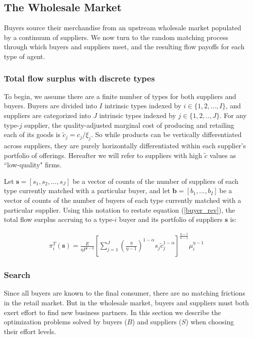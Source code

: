 \documentclass[12pt]{article} \usepackage{amsmath,amssymb,amsthm,geometry,graphicx,setspace,algorithm,algpseudocode,float}
\begin{document}
\subsection{The Wholesale Market}

Buyers source their merchandise from an upstream wholesale market populated by a continuum of  suppliers. We now turn to the random matching process through which buyers and suppliers meet, and the resulting flow payoffs for each type of agent. 

\label{sec:payoff_functions}

\subsubsection{Total flow surplus with discrete types}  
\label{sec:discrete_types}
To begin, we assume there are a finite number of types for both suppliers and buyers. Buyers are divided into $I$ intrinsic types indexed by $i\in \{1,2,...,I\}$, and  suppliers are categorized into $J$ intrinsic types indexed by $j\in \{1,2,..,J\}$. For any type-$j$ supplier, the quality-adjusted marginal cost of producing and retailing each of its goods is $\tilde{c}_{j}=c_j/\xi_j$. So while products can be vertically differentiated across suppliers, they are purely horizontally differentiated within each supplier's portfolio of offerings. Hereafter we will refer to suppliers with high $\tilde{c}$ values as ``low-quality" firms.
\par
Let $\mathbf{s}=\left[ s_{1},s_{2},...,s_{J}\right] $ be a vector of counts of
the number of suppliers of each type currently matched with a particular buyer, and let $\mathbf{b=}\left[ b_{1},...,b_{I}\right] \ $be a vector of counts of the number of buyers of each type currently matched with a particular supplier.
Using this notation to restate equation (\ref{buyer_rev}), the total flow surplus accruing to a type-$i$ buyer and its portfolio of suppliers $\mathbf{s}$ is:

\begin{align}
\pi _{i}^{T}(\mathbf{s})=\frac{E}{\eta P^{1-\eta }}\left[ \sum_{j=1}^{J}\left( 
\frac{\eta }{\eta -1}\right) ^{1-\alpha }s_{j}\tilde{c}_{j}^{1-\alpha }\right] ^{\frac{\eta -1}{\alpha -1}}\mu _{i}^{\eta -1}  \label{total_surplus}
\end{align}

\subsubsection{Search}
\label{sec:search}
Since all buyers are known to the final consumer, there are no matching frictions in the retail market. But in the wholesale market, buyers and suppliers must both exert effort to find new business partners. In this section we describe the optimization problems solved by buyers ($B$) and suppliers ($S$) when choosing their effort levels.
\end{document}
